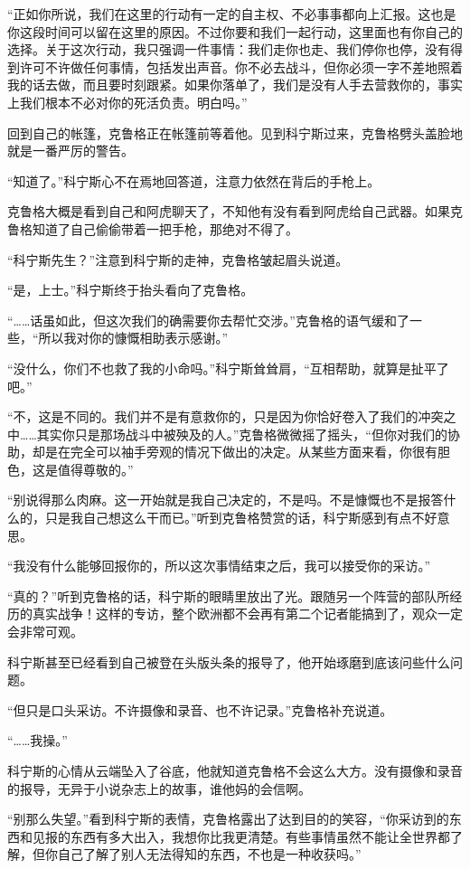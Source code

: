 “正如你所说，我们在这里的行动有一定的自主权、不必事事都向上汇报。这也是你这段时间可以留在这里的原因。不过你要和我们一起行动，这里面也有你自己的选择。关于这次行动，我只强调一件事情：我们走你也走、我们停你也停，没有得到许可不许做任何事情，包括发出声音。你不必去战斗，但你必须一字不差地照着我的话去做，而且要时刻跟紧。如果你落单了，我们是没有人手去营救你的，事实上我们根本不必对你的死活负责。明白吗。”

回到自己的帐篷，克鲁格正在帐篷前等着他。见到科宁斯过来，克鲁格劈头盖脸地就是一番严厉的警告。

“知道了。”科宁斯心不在焉地回答道，注意力依然在背后的手枪上。

克鲁格大概是看到自己和阿虎聊天了，不知他有没有看到阿虎给自己武器。如果克鲁格知道了自己偷偷带着一把手枪，那绝对不得了。

“科宁斯先生？”注意到科宁斯的走神，克鲁格皱起眉头说道。

“是，上士。”科宁斯终于抬头看向了克鲁格。

“……话虽如此，但这次我们的确需要你去帮忙交涉。”克鲁格的语气缓和了一些，“所以我对你的慷慨相助表示感谢。”

“没什么，你们不也救了我的小命吗。”科宁斯耸耸肩，“互相帮助，就算是扯平了吧。”

“不，这是不同的。我们并不是有意救你的，只是因为你恰好卷入了我们的冲突之中……其实你只是那场战斗中被殃及的人。”克鲁格微微摇了摇头，“但你对我们的协助，却是在完全可以袖手旁观的情况下做出的决定。从某些方面来看，你很有胆色，这是值得尊敬的。”

“别说得那么肉麻。这一开始就是我自己决定的，不是吗。不是慷慨也不是报答什么的，只是我自己想这么干而已。”听到克鲁格赞赏的话，科宁斯感到有点不好意思。

“我没有什么能够回报你的，所以这次事情结束之后，我可以接受你的采访。”

“真的？”听到克鲁格的话，科宁斯的眼睛里放出了光。跟随另一个阵营的部队所经历的真实战争！这样的专访，整个欧洲都不会再有第二个记者能搞到了，观众一定会非常可观。

科宁斯甚至已经看到自己被登在头版头条的报导了，他开始琢磨到底该问些什么问题。

“但只是口头采访。不许摄像和录音、也不许记录。”克鲁格补充说道。

“……我操。”

科宁斯的心情从云端坠入了谷底，他就知道克鲁格不会这么大方。没有摄像和录音的报导，无异于小说杂志上的故事，谁他妈的会信啊。

“别那么失望。”看到科宁斯的表情，克鲁格露出了达到目的的笑容，“你采访到的东西和见报的东西有多大出入，我想你比我更清楚。有些事情虽然不能让全世界都了解，但你自己了解了别人无法得知的东西，不也是一种收获吗。”

